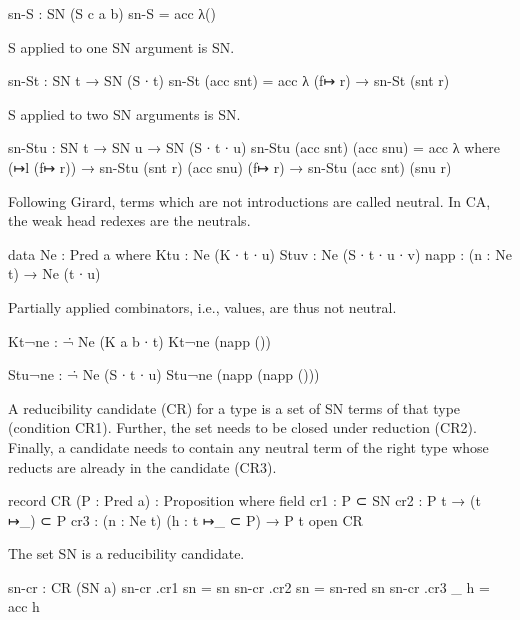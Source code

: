 \begin{code}
sn-S : SN (S {c} {a} {b})
sn-S = acc λ()
\end{code}

S applied to one SN argument is SN.

\begin{code}
sn-St : SN t → SN (S ∙ t)
sn-St (acc snt) = acc λ{ (f↦ r) → sn-St (snt r) }
\end{code}

S applied to two SN arguments is SN.

\begin{code}
sn-Stu : SN t → SN u → SN (S ∙ t ∙ u)
sn-Stu (acc snt) (acc snu) = acc λ where
  (↦l (f↦ r))  → sn-Stu (snt r) (acc snu)
  (f↦ r)       → sn-Stu (acc snt) (snu r)
\end{code}


Following Girard, terms which are not introductions are called neutral.
In CA, the weak head redexes are the neutrals.

\begin{code}
data Ne : Pred a where
  Ktu   : Ne (K ∙ t ∙ u)
  Stuv  : Ne (S ∙ t ∙ u ∙ v)
  napp  : (n : Ne t) → Ne (t ∙ u)
\end{code}

Partially applied combinators, i.e., values, are thus not neutral.

\begin{code}
Kt¬ne : ¬̇ Ne (K {a} {b} ∙ t)
Kt¬ne (napp ())

Stu¬ne : ¬̇ Ne (S ∙ t ∙ u)
Stu¬ne (napp (napp ()))
\end{code}

A reducibility candidate (CR) for a type is a set of SN terms of that type
(condition CR1).
Further, the set needs to be closed under reduction (CR2).
Finally, a candidate needs to contain any neutral term of the right type
whose reducts are already in the candidate (CR3).

\begin{code}
record CR (P : Pred a) : Proposition where
  field
    cr1  : P ⊂ SN
    cr2  : P t → (t ↦_) ⊂ P
    cr3  : (n : Ne t) (h : t ↦_ ⊂ P) → P t
open CR
\end{code}

The set SN is a reducibility candidate.

\begin{code}
sn-cr : CR (SN {a})
sn-cr .cr1 sn   = sn
sn-cr .cr2 sn   = sn-red sn
sn-cr .cr3 _ h  = acc h
\end{code}

